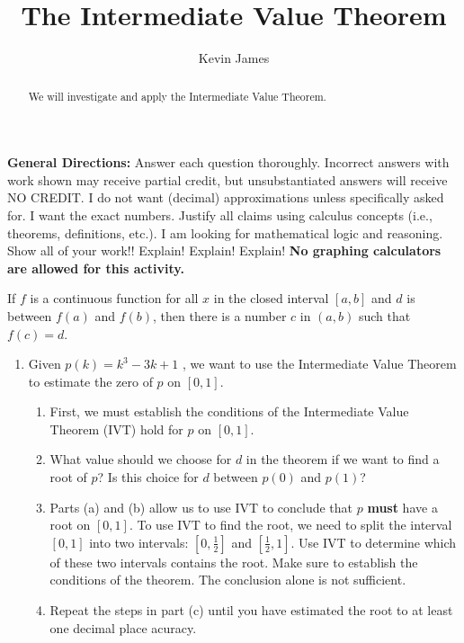 \documentclass[handout,nooutcomes,noauthor,12pt]{ximera}
\author{Kevin James}
\title{The Intermediate Value Theorem}
\begin{document}
	\begin{abstract}
		We will investigate and apply the Intermediate Value Theorem.
	\end{abstract}
	\maketitle
	\textbf{General Directions:}  Answer each question thoroughly.  Incorrect answers with work shown may receive partial credit, but unsubstantiated answers will receive NO CREDIT.  I do not want (decimal) approximations unless specifically asked for.  I want the exact numbers.  Justify all claims using calculus concepts (i.e., theorems, definitions, etc.).  I am looking for mathematical logic and reasoning.  Show all of your work!! Explain!  Explain!  Explain!  \textbf{No graphing calculators are allowed for this activity.}
	
	\begin{theorem}\label{theorem:IVT}
		If $f$ is a continuous function for all $x$ in the closed interval
		$[a,b]$ and $d$ is between $f(a)$ and $f(b)$, then there is a number
		$c$ in $(a, b)$ such that $f(c) = d$.
	\end{theorem}
	
	\clearpage

	\begin{enumerate}[label=\arabic*]
		\item Given $ p(k) = k^3-3k+1 $ , we want to use the Intermediate Value Theorem to estimate the zero of $ p $ on $ [0, 1] $.
		\begin{enumerate}[label=\alph*]
			\item First, we must establish the conditions of the Intermediate Value Theorem (IVT) hold for $ p $ on $ [0, 1] $.
			\vspace{3cm}
			\item What value should we choose for $ d $ in the theorem if we want to find a root of $ p $?  Is this choice for $ d $ between $ p(0) $ and $ p(1) $?
			\vspace{3cm}
			\item Parts (a) and (b) allow us to use IVT to conclude that $ p $ \textbf{must} have a root on $ [0, 1] $.  To use IVT to find the root, we need to split the interval $ [0, 1] $ into two intervals: $ \left[0, \frac{1}{2}\right] $ and $ \left[\frac{1}{2}, 1\right] $.  Use IVT to determine which of these two intervals contains the root.  Make sure to establish the conditions of the theorem.  The conclusion alone is not sufficient.
			
			\clearpage
			
			\item Repeat the steps in part (c) until you have estimated the root to at least one decimal place acuracy.
		\end{enumerate}
	\end{enumerate}
\end{document}
